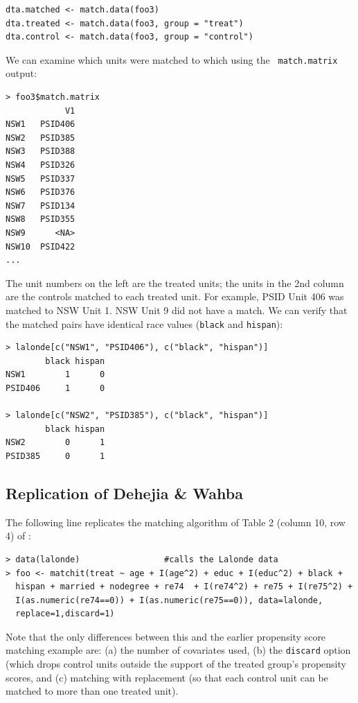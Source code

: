 \documentclass[oneside,letterpaper,titlepage]{article}
\begin{document}
\begin{verbatim}
dta.matched <- match.data(foo3)
dta.treated <- match.data(foo3, group = "treat")
dta.control <- match.data(foo3, group = "control")
\end{verbatim}

We can examine which units were matched to which using the {\tt
  match.matrix} output:
\begin{verbatim}
> foo3$match.matrix
            V1
NSW1   PSID406
NSW2   PSID385
NSW3   PSID388
NSW4   PSID326
NSW5   PSID337
NSW6   PSID376
NSW7   PSID134
NSW8   PSID355
NSW9      <NA>
NSW10  PSID422
...  
\end{verbatim}  %

The unit numbers on the left are the treated units; the units in the
2nd column are the controls matched to each treated unit.  For
example, PSID Unit 406 was matched to NSW Unit 1.  NSW Unit 9 did not
have a match.  We can verify that the matched pairs have identical
race values (\texttt{black} and \texttt{hispan}):

\begin{verbatim}
> lalonde[c("NSW1", "PSID406"), c("black", "hispan")]
        black hispan
NSW1        1      0
PSID406     1      0

> lalonde[c("NSW2", "PSID385"), c("black", "hispan")]
        black hispan
NSW2        0      1
PSID385     0      1
\end{verbatim}


\subsection{Replication of Dehejia \& Wahba}

The following line replicates the matching algorithm of Table 2
(column 10, row 4) of \citet{DehWah99}:

\begin{verbatim}
> data(lalonde)                 #calls the Lalonde data
> foo <- matchit(treat ~ age + I(age^2) + educ + I(educ^2) + black +
  hispan + married + nodegree + re74  + I(re74^2) + re75 + I(re75^2) +
  I(as.numeric(re74==0)) + I(as.numeric(re75==0)), data=lalonde,
  replace=1,discard=1)
\end{verbatim}

Note that the only differences between this and the earlier propensity
score matching example are: (a) the number of covariates used, (b) the
\texttt{discard} option (which drops control units outside the support
of the treated group's propensity scores, and (c) matching with
replacement (so that each control unit can be matched to more than one
treated unit).
\end{document}

